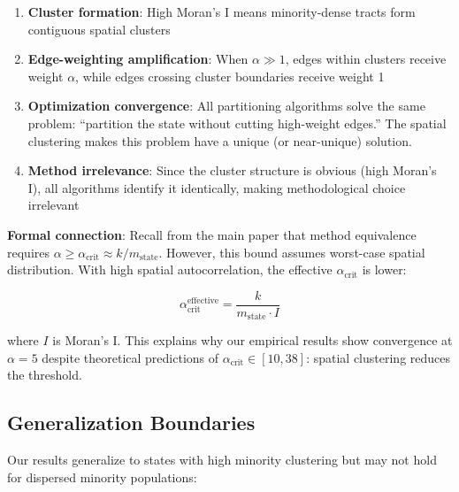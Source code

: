 \begin{enumerate}
    \item \textbf{Cluster formation}: High Moran's I means minority-dense tracts form contiguous spatial clusters

    \item \textbf{Edge-weighting amplification}: When $\alpha \gg 1$, edges within clusters receive weight $\alpha$, while edges crossing cluster boundaries receive weight 1

    \item \textbf{Optimization convergence}: All partitioning algorithms solve the same problem: ``partition the state without cutting high-weight edges.'' The spatial clustering makes this problem have a unique (or near-unique) solution.

    \item \textbf{Method irrelevance}: Since the cluster structure is obvious (high Moran's I), all algorithms identify it identically, making methodological choice irrelevant
\end{enumerate}

\textbf{Formal connection}: Recall from the main paper that method equivalence requires $\alpha \geq \alpha_{\text{crit}} \approx k / m_{\text{state}}$. However, this bound assumes worst-case spatial distribution. With high spatial autocorrelation, the effective $\alpha_{\text{crit}}$ is lower:

\[
\alpha_{\text{crit}}^{\text{effective}} = \frac{k}{m_{\text{state}} \cdot I}
\]

where $I$ is Moran's I. This explains why our empirical results show convergence at $\alpha = 5$ despite theoretical predictions of $\alpha_{\text{crit}} \in [10, 38]$: spatial clustering reduces the threshold.

\subsection{Generalization Boundaries}

Our results generalize to states with high minority clustering but may not hold for dispersed minority populations:

